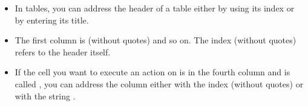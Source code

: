 \begin{itemize}
\item In tables, you can address the header of a table either by using its index or by entering its title. 
\item The first column is  (without quotes)  and so on. The index  (without quotes) refers to the header itself. 
\item If the cell you want to execute an action on is in the fourth column and is called , you can address the column either with the index  (without quotes) or with the string . 

\end{itemize}   

